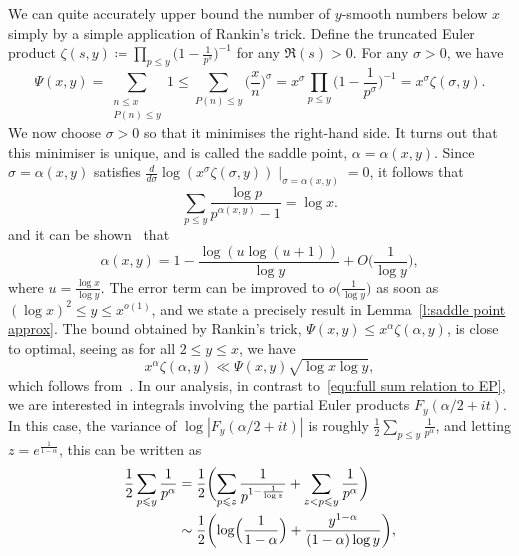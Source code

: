 \documentclass[12pt,a4paper,reqno]{amsart}
\numberwithin{equation}{section}
\def\leq {\leqslant}
\theoremstyle{remark}
\theoremstyle{definition}
\numberwithin{equation}{section}
\theoremstyle{remark}
\begin{document}
We can quite accurately upper bound the number of $y$-smooth numbers below $x$ simply by a simple application of Rankin's trick. Define the truncated Euler product $\zeta(s,y) \coloneqq \prod_{p \leq y} \bigl( 1 - \frac{1}{p^s} \bigr)^{-1}$ for any $\Re (s) > 0$. For any $\sigma > 0$, we have
\begin{equation}\label{equ:rankins trick}
\Psi(x,y) = \sum_{\substack{n \leq x \\ P(n) \leq y}} 1 \leq \sum_{P(n) \leq y} \biggl( \frac{x}{n} \biggr)^{\sigma} = x^\sigma \prod_{p \leq y} \biggl( 1 - \frac{1}{p^{\sigma}} \biggr)^{-1} = x^{\sigma} \zeta (\sigma, y) .
\end{equation}
We now choose $\sigma > 0$ so that it minimises the right-hand side. It turns out that this minimiser is unique, and is called the saddle point, $\alpha = \alpha (x,y)$. Since $\sigma = \alpha(x,y)$ satisfies $\frac{d}{d \sigma} \log (x^{\sigma} \zeta(\sigma, y)) \mid_{\sigma = \alpha (x,y)} = 0$, it follows that
\[
\sum_{p \leq y} \frac{\log p}{p^{\alpha (x,y)}-1} = \log x .
\]
and it can be shown~\cite[Lemmas~1 and~2]{HildTen86} that
\begin{equation}\label{equ: Saddle point approx in intro}
\alpha (x,y) = 1 - \frac{\log (u \log (u + 1))}{\log y} + O \biggl( \frac{1}{\log y} \biggr),
\end{equation}
where $u = \frac{\log x}{\log y}$. The error term can be improved to $o\bigl( \frac{1}{\log y} \bigr)$ as soon as $(\log x)^2 \leq y \leq x^{o(1)}$, and we state a precisely result in Lemma~\ref{l:saddle point approx}. The bound obtained by Rankin's trick, $\Psi(x,y) \leq x^{\alpha} \zeta(\alpha,y)$, is close to optimal, seeing as for all $2 \leq y \leq x$, we have
\begin{equation}\label{equ:rankin to true count comparison}
x^{\alpha} \zeta(\alpha,y) \ll \Psi(x,y) \sqrt{\log x \log y},
\end{equation}
which follows from~\cite[Theorems~1 and~2]{HildTen86}. In our analysis, in contrast to~\eqref{equ:full sum relation to EP}, we are interested in integrals involving the partial Euler products $F_y (\alpha / 2 + it)$. In this case, the variance of $\log |F_y (\alpha/2 + it)|$ is roughly $\frac{1}{2} \sum_{p \leq y} \frac{1}{p^{\alpha}}$, and 
letting $z = e^{\frac{1}{1 - \alpha}}$, this can be written as
\begin{equation}\label{equ: variance evaluation}
\begin{split}
\frac{1}{2} \sum_{p \leq y} \frac{1}{p^{\alpha}}
& = \frac{1}{2} \biggl( \sum_{p \leq z} \frac{1}{p^{1 - \frac{1}{\log z}}} + \sum_{z < p \leq y} \frac{1}{p^{\alpha}} \biggr) \\
& \sim \frac{1}{2} \biggl( \log \Bigl( \frac{1}{1 - \alpha} \Bigr) + \frac{y^{1 - \alpha}}{(1 - \alpha) \log y} \biggr),
\end{split}
\end{equation}
\end{document}
